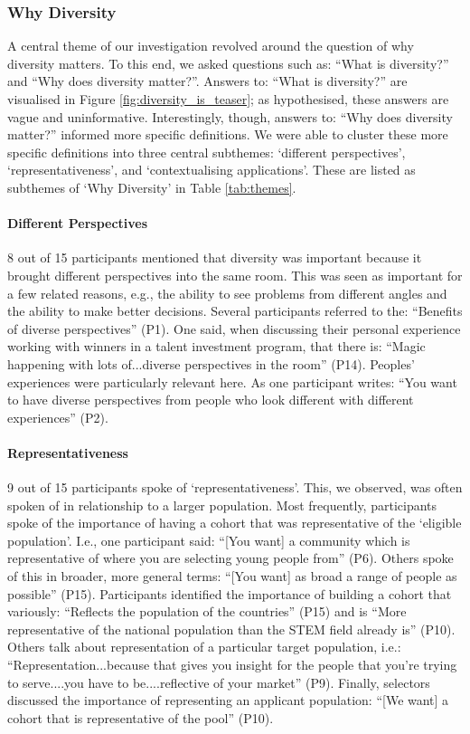 \subsubsection{Why Diversity}
A central theme of our investigation revolved around the question of why diversity matters. To this end, we asked questions such as: ``What is diversity?'' and ``Why does diversity matter?''. Answers to: ``What is diversity?'' are visualised in Figure \ref{fig:diversity_is_teaser}; as hypothesised, these answers are vague and uninformative. Interestingly, though, answers to: ``Why does diversity matter?'' informed more specific definitions. We were able to cluster these more specific definitions into three central subthemes: `different perspectives', `representativeness', and `contextualising applications'. These are listed as subthemes of `Why Diversity' in Table \ref{tab:themes}.

\paragraph{Different Perspectives}
8 out of 15 participants mentioned that diversity was important because it brought different perspectives into the same room. This was seen as important for a few related reasons, e.g., the ability to see problems from different angles and the ability to make better decisions. Several participants referred to the: ``Benefits of diverse perspectives'' (P1). One said, when discussing their personal experience working with winners in a talent investment program, that there is: ``Magic happening with lots of...diverse perspectives in the room'' (P14). Peoples' experiences were particularly relevant here. As one participant writes: ``You want to have diverse perspectives from people who look different with different experiences'' (P2).

\paragraph{Representativeness}
9 out of 15 participants spoke of `representativeness'. This, we observed, was often spoken of in relationship to a larger population. Most frequently, participants spoke of the importance of having a cohort that was representative of the `eligible population'. I.e., one participant said: ``[You want] a community which is representative of where you are selecting young people from'' (P6). Others spoke of this in broader, more general terms: ``[You want] as broad a range of people as possible'' (P15). Participants identified the importance of building a cohort that variously: ``Reflects the population of the countries'' (P15) and is ``More representative of the national population than the STEM field already is'' (P10). Others talk about representation of a particular target population, i.e.: ``Representation...because that gives you insight for the people that you're trying to serve....you have to be....reflective of your market'' (P9). Finally, selectors discussed the importance of representing an applicant population: ``[We want] a cohort that is representative of the pool'' (P10).

